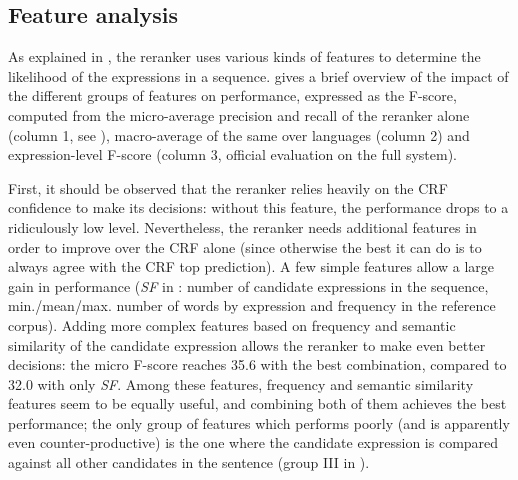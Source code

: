 \documentclass[output=paper
,modfonts
,nonflat]{langsci/langscibook}
\begin{document}
\subsection{Feature analysis}
\label{moreau:sec:featuresAnalysis}


As explained in , the reranker uses various kinds of
features to determine the likelihood of the expressions in a
sequence.  gives a brief overview of
the impact of the different groups of features on performance,
expressed as the F-score, computed from the micro-average precision
and recall of the reranker alone (column 1, see
), macro-average of the same over languages
(column 2) and expression-level F-score (column 3, official evaluation
on the full system).

First, it should be observed that the reranker relies heavily on the
CRF confidence to make its decisions: without this feature, the
performance drops to a ridiculously low level. Nevertheless, the
reranker needs additional features in order to improve over the CRF
alone (since otherwise the best it can do is to always agree with the
CRF top prediction). A few simple features allow a large gain in performance ({\em SF} in 
: number of candidate expressions in the
sequence, min./mean/max. number of words by expression and frequency
in the reference corpus). Adding more
complex features based on frequency and semantic similarity of the
candidate expression allows the reranker to make even better decisions:
the micro F-score reaches 35.6 with the best combination, compared to
32.0 with only {\em SF}. Among these features, frequency and semantic
similarity features seem to be equally useful, and combining both of them
achieves the best performance; the only group of features which
performs poorly (and is apparently even counter-productive) is the one
where the candidate expression is compared against all
other candidates in the sentence (group III in
).
\end{document}
